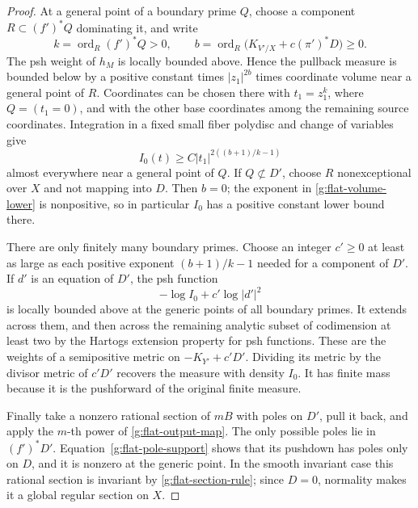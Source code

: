 \begin{proof}
At a general point of a boundary prime \(Q\), choose a component
\(R\subset(f')^*Q\) dominating it, and write
\[
 k=\operatorname{ord}_R(f')^*Q>0,\qquad
 b=\operatorname{ord}_R\bigl(K_{V'/X}+c(\pi')^*D\bigr)\ge0.
\]
The psh weight of \(h_M\) is locally bounded above.  Hence the pullback
measure is bounded below by a positive constant times
\(|z_1|^{2b}\) times coordinate volume near a general point of \(R\).
Coordinates can be chosen there with \(t_1=z_1^k\), where \(Q=(t_1=0)\),
and with the other base coordinates among the remaining source
coordinates.  Integration in a fixed small fiber polydisc and change of
variables give
\begin{equation}
                    I_0(t)\ge C|t_1|^{2((b+1)/k-1)}
 \label{g:flat-volume-lower}
\end{equation}
almost everywhere near a general point of \(Q\).  If \(Q\not\subset D'\),
choose \(R\) nonexceptional over \(X\) and not mapping into \(D\).
Then \(b=0\); the exponent in \eqref{g:flat-volume-lower} is nonpositive,
so in particular \(I_0\) has a positive constant lower bound there.

There are only finitely many boundary primes.  Choose an integer
\(c'\ge0\) at least as large as each positive exponent
\((b+1)/k-1\) needed for a component of \(D'\).  If \(d'\) is an equation
of \(D'\), the psh function
\[
                     -\log I_0+c'\log|d'|^2
\]
is locally bounded above at the generic points of all boundary primes.
It extends across them, and then across the remaining analytic subset
of codimension at least two by the Hartogs extension property for psh
functions.  These are the weights of a semipositive metric on
\(-K_{Y'}+c'D'\).  Dividing its metric by the divisor metric of \(c'D'\)
recovers the measure with density \(I_0\).  It has finite mass because it
is the pushforward of the original finite measure.

Finally take a nonzero rational section of \(mB\) with poles on \(D'\),
pull it back, and apply the \(m\)-th power of
\eqref{g:flat-output-map}.  The only possible poles lie in
\((f')^*D'\).  Equation~\eqref{g:flat-pole-support} shows that its
pushdown has poles only on \(D\), and it is nonzero at the generic point.
In the smooth invariant case this rational section is invariant by
\eqref{g:flat-section-rule}; since \(D=0\), normality makes it a global
regular section on \(X\).
\end{proof}

